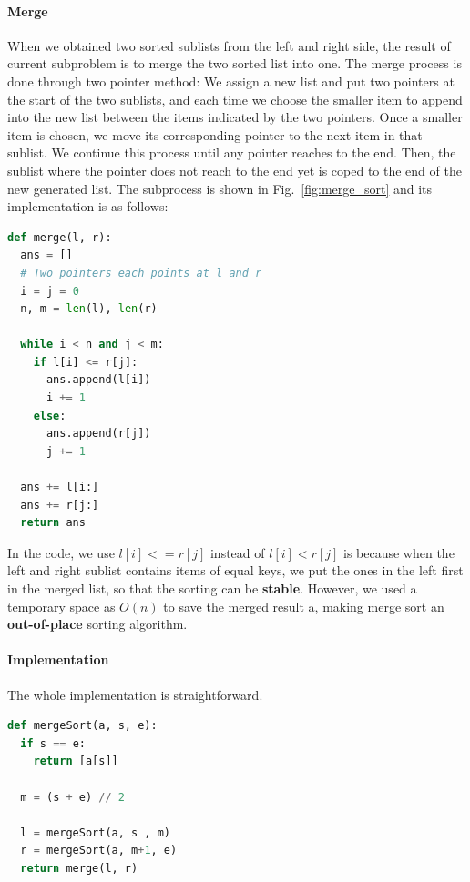 \documentclass[../main.tex]{subfiles}
\begin{document}
\paragraph{Merge} When we obtained two sorted sublists from the left and right side, the result of current subproblem is to merge the two sorted list into one. The merge process is done through two pointer method:  We assign a new list and put two pointers at the start of the two sublists, and each time we choose the smaller item to append into the new list between the items indicated by the two pointers. Once a smaller item is chosen, we move its corresponding pointer to the next item in that sublist. We continue this process  until any pointer reaches to the end. Then, the sublist where the pointer does not reach to the end yet is coped to the end of the new generated list.  The subprocess is shown in Fig.~\ref{fig:merge_sort} and its implementation  is as follows:
\begin{lstlisting}[language=Python]
def merge(l, r): 
  ans = []
  # Two pointers each points at l and r
  i = j = 0 
  n, m = len(l), len(r)

  while i < n and j < m: 
    if l[i] <= r[j]:
      ans.append(l[i])
      i += 1
    else:
      ans.append(r[j])
      j += 1
      
  ans += l[i:]
  ans += r[j:]
  return ans
\end{lstlisting}

In the code, we use $l[i] <= r[j]$ instead of $l[i] < r[j]$ is because when the left and right sublist contains items of equal keys,  we put the ones in the left first in the merged list, so that the sorting can be  \textbf{stable}. However, we used a temporary space as $O(n)$ to save the merged result a, making merge sort an  \textbf{ out-of-place} sorting algorithm.

\paragraph{Implementation} The whole implementation is straightforward. 
\begin{lstlisting}[language = Python]
def mergeSort(a, s, e):
  if s == e:
    return [a[s]]

  m = (s + e) // 2 

  l = mergeSort(a, s , m)
  r = mergeSort(a, m+1, e)
  return merge(l, r)
\end{lstlisting}
\end{document}

